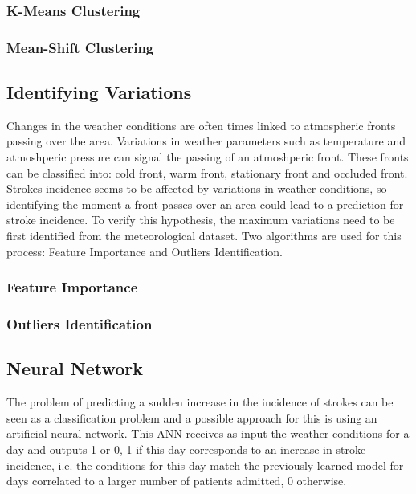 \documentclass{article}
\begin{document}
\subsubsection{K-Means Clustering}

\subsubsection{Mean-Shift Clustering}

\subsection{Identifying Variations}

Changes in the weather conditions are often times linked to atmospheric fronts passing over the area. Variations in weather parameters such as temperature and atmoshperic pressure can signal the passing of an atmoshperic front. These fronts can be classified into: cold front, warm front, stationary front and occluded front. Strokes incidence seems to be affected by variations in weather conditions, so identifying the moment a front passes over an area could lead to a prediction for stroke incidence. To verify this hypothesis, the maximum variations need to be first identified from the meteorological dataset. Two algorithms are used for this process: Feature Importance and Outliers Identification.

\subsubsection{Feature Importance}
\subsubsection{Outliers Identification}

\subsection{Neural Network}

The problem of predicting a sudden increase in the incidence of strokes  can be seen as a classification problem and a possible approach for this is using an artificial neural network. This ANN receives as input the weather conditions for a day and outputs 1 or 0, 1 if this day corresponds to an increase in stroke incidence, i.e. the conditions for this day match the previously learned model for days correlated to a larger number of patients admitted, 0 otherwise. 
\end{document}
